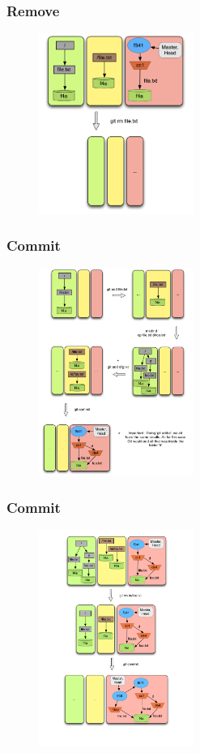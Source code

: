 \documentclass{beamer}
\begin{document}
\begin{frame}[fragile]
   \frametitle{Remove}
   \begin{figure}
      \centering
      \includegraphics[width=0.45\textwidth]{images/remove1.png}
   \end{figure}
\end{frame}

\begin{frame}[fragile]
   \frametitle{Commit}
   \begin{figure}
      \centering
      \includegraphics[width=0.45\textwidth]{images/commit1.png}
   \end{figure}
\end{frame}

\begin{frame}[fragile]
   \frametitle{Commit}
   \begin{figure}
      \centering
      \includegraphics[width=0.45\textwidth]{images/commit2.png}
   \end{figure}
\end{frame}
\end{document}
